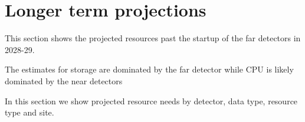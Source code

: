 \documentclass[12pt]{article}
\begin{document}
\section{Longer term projections}

This section shows the projected resources past the startup of the far detectors in 2028-29. 

The estimates for storage are dominated by the far detector while CPU is likely dominated by the near detectors

In this section we show projected resource needs by detector, data type, resource type and site.

{
}

{
}














\end{document}

